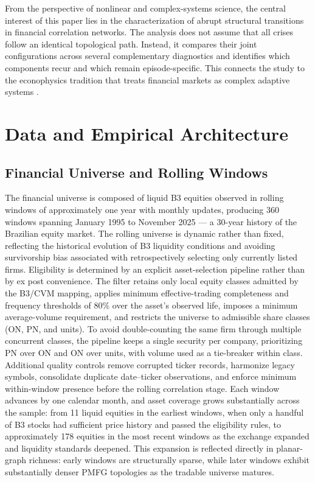 \documentclass[a4paper,fleqn,review]{cas-sc}
\begin{document}
From the perspective of nonlinear and complex-systems science, the central interest of this paper lies in the characterization of abrupt structural transitions in financial correlation networks. The analysis does not assume that all crises follow an identical topological path. Instead, it compares their joint configurations across several complementary diagnostics and identifies which components recur and which remain episode-specific. This connects the study to the econophysics tradition that treats financial markets as complex adaptive systems \citep{mantegna1999hierarchical,stanley1996scaling}.

\section{Data and Empirical Architecture}
\label{sec:data_methodology}

\subsection{Financial Universe and Rolling Windows}

The financial universe is composed of liquid B3 equities observed in rolling windows of approximately one year with monthly updates, producing 360 windows spanning January 1995 to November 2025 --- a 30-year history of the Brazilian equity market. The rolling universe is dynamic rather than fixed, reflecting the historical evolution of B3 liquidity conditions and avoiding survivorship bias associated with retrospectively selecting only currently listed firms. Eligibility is determined by an explicit asset-selection pipeline rather than by ex post convenience. The filter retains only local equity classes admitted by the B3/CVM mapping, applies minimum effective-trading completeness and frequency thresholds of 80\% over the asset's observed life, imposes a minimum average-volume requirement, and restricts the universe to admissible share classes (ON, PN, and units). To avoid double-counting the same firm through multiple concurrent classes, the pipeline keeps a single security per company, prioritizing PN over ON and ON over units, with volume used as a tie-breaker within class. Additional quality controls remove corrupted ticker records, harmonize legacy symbols, consolidate duplicate date--ticker observations, and enforce minimum within-window presence before the rolling correlation stage. Each window advances by one calendar month, and asset coverage grows substantially across the sample: from 11 liquid equities in the earliest windows, when only a handful of B3 stocks had sufficient price history and passed the eligibility rules, to approximately 178 equities in the most recent windows as the exchange expanded and liquidity standards deepened. This expansion is reflected directly in planar-graph richness: early windows are structurally sparse, while later windows exhibit substantially denser PMFG topologies as the tradable universe matures.
\end{document}
